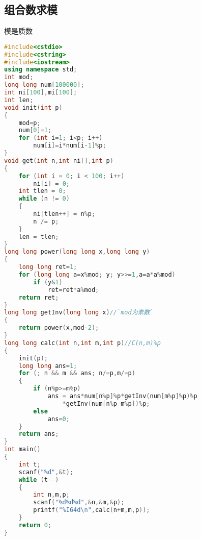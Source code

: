 \subsection{组合数求模}
	模是质数
	\begin{lstlisting}[language=c++]
#include<cstdio>
#include<cstring>
#include<iostream>
using namespace std;
int mod;
long long num[100000];
int ni[100],mi[100];
int len;
void init(int p)
{
	mod=p;
	num[0]=1;
	for (int i=1; i<p; i++)
		num[i]=i*num[i-1]%p;
}
void get(int n,int ni[],int p)
{
	for (int i = 0; i < 100; i++)
		ni[i] = 0;
	int tlen = 0;
	while (n != 0)
	{
		ni[tlen++] = n%p;
		n /= p;
	}
	len = tlen;
}
long long power(long long x,long long y)
{
	long long ret=1;
	for (long long a=x%mod; y; y>>=1,a=a*a%mod)
		if (y&1)
			ret=ret*a%mod;
	return ret;
}
long long getInv(long long x)//`mod为素数`
{
	return power(x,mod-2);
}
long long calc(int n,int m,int p)//C(n,m)%p
{
	init(p);
	long long ans=1;
	for (; n && m && ans; n/=p,m/=p)
	{
		if (n%p>=m%p)
			ans = ans*num[n%p]%p*getInv(num[m%p]%p)%p
				*getInv(num[n%p-m%p])%p;
		else
			ans=0;
	}
	return ans;
}
int main()
{
	int t;
	scanf("%d",&t);
	while (t--)
	{
		int n,m,p;
		scanf("%d%d%d",&n,&m,&p);
		printf("%I64d\n",calc(n+m,m,p));
	}
	return 0;
}
	\end{lstlisting}
